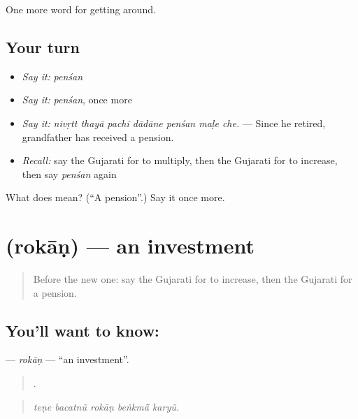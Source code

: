 \begin{grammarlens}[title={What you've built}]
One more word for getting around.
\end{grammarlens}

\subsection*{Your turn}
\begin{itemize}
\raggedright
  \item \emph{Say it:} \emph{penśan}
  \item \emph{Say it:} \emph{penśan}, once more
  \item \emph{Say it:} \emph{nivṛtt thayā pachī dādāne penśan maḷe che.} — Since he retired, grandfather has received a pension.
  \item \emph{Recall:} say the Gujarati for to multiply, then the Gujarati for to increase, then say \emph{penśan} again
\end{itemize}

\begin{tcolorbox}[breakable,colback=teal!4,colframe=teal!35!black,title={Before you move on}]
What does  mean? (\textquotedblleft{}A pension\textquotedblright{}.) Say it once more.
\end{tcolorbox}
\section[\texorpdfstring{\gu{રોકાણ} (rokāṇ)}{રોકાણ (rokāṇ)}]{ (rokāṇ) — an investment}

\label{lesson:GU-C427-rokan}



\begin{quote}
Before the new one: say the Gujarati for to increase, then the Gujarati for a pension.
\end{quote}

\subsection*{You'll want to know: }
\textbf{} — \emph{rokāṇ} — \textquotedblleft{}an investment\textquotedblright{}.

\begin{quote}
    .
\end{quote}

\begin{quote}
\emph{teṇe bacatnũ rokāṇ beṅkmā̃ karyũ.}
\end{quote}

